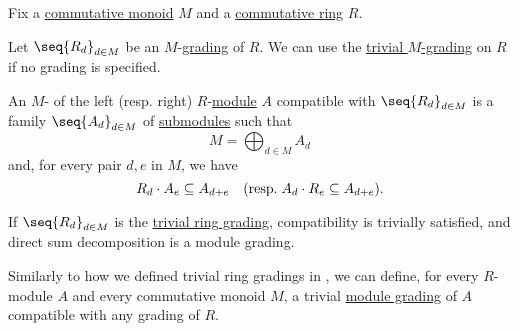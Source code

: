 \begin{definition}\label{def:graded_module}
  Fix a \hyperref[def:monoid/commutative]{commutative monoid} \( M \) and a \hyperref[def:ring/commutative]{commutative ring} \( R \).

  Let \( \seq{ R_d }_{d \in M} \) be an \( M \)-\hyperref[def:graded_ring]{grading} of \( R \). We can use the \hyperref[def:trivial_ring_grading]{trivial \( M \)-grading} on \( R \) if no grading is specified.

  An \( M \)- of the left (resp. right) \( R \)-\hyperref[def:module]{module} \( A \) compatible with \( \seq{ R_d }_{d \in M} \) is a family \( \seq{ A_d }_{d \in M} \) of \hyperref[def:module/submodule]{submodules} such that
  \begin{equation*}
    M = \bigoplus_{d \in M} A_d
  \end{equation*}
  and, for every pair \( d, e \) in \( M \), we have
  \begin{equation}\label{eq:def:graded_module}
    R_d \cdot A_e \subseteq A_{d + e} \quad (\T{resp.} A_d \cdot R_e \subseteq A_{d + e}).
  \end{equation}
\end{definition}
\begin{comments}
  \item If \( \seq{ R_d }_{d \in M} \) is the \hyperref[def:trivial_ring_grading]{trivial ring grading}, compatibility is trivially satisfied, and direct sum decomposition is a module grading.
\end{comments}

\begin{definition}\label{def:trivial_module_grading}\mimprovised
  Similarly to how we defined trivial ring gradings in , we can define, for every \( R \)-module \( A \) and every commutative monoid \( M \), a trivial \hyperref[def:graded_module]{module grading} of \( A \) compatible with any grading of \( R \).
\end{definition}

